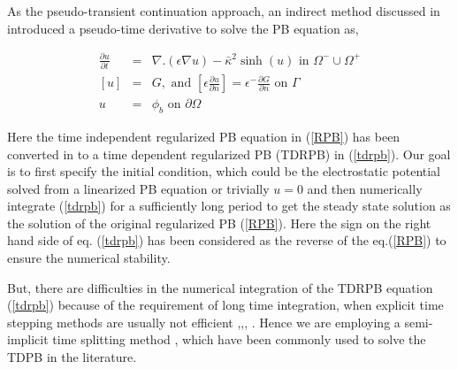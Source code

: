 As the pseudo-transient continuation approach, an indirect method discussed in \cite{zhao_pseudo-time-coupled_2011} \cite{Sayyed-Ahmad2004} \cite{shestakov_solution_2002} introduced a pseudo-time derivative to solve the PB equation as,  

\begin{eqnarray}
	 	\frac{\partial u}{\partial t} &=& \nabla.(\epsilon \nabla u)-\bar\kappa^2 \sinh(u) \text{ in } \Omega^- \cup \Omega^+ \label{tdrpb} \\
	 	  \left[u\right]&=& G,\text{ and } \left[\epsilon\frac{\partial u}{\partial n}\right]= \epsilon^-  \frac{\partial G}{\partial n} \text{ on } \Gamma\\ \label{jump}
	 	  u&=&\phi_b \text{ on } \partial \Omega
	\end{eqnarray}

Here the time independent regularized PB equation in (\ref{RPB}) has been converted in to a time dependent regularized PB (TDRPB) in (\ref{tdrpb}). Our goal is to first specify the initial condition, which could be the electrostatic potential solved from a linearized PB \cite{zhao_pseudo-time-coupled_2011} equation or trivially $u = 0$ and then numerically integrate (\ref{tdrpb}) for a sufficiently long period to get the steady state solution as the solution of the original regularized PB (\ref{RPB}). Here the sign on the right hand side of eq. (\ref{tdrpb}) has been considered as the reverse of the eq.(\ref{RPB}) to ensure the numerical stability. 

But, there are difficulties in the numerical integration of the TDRPB equation (\ref{tdrpb}) because of the requirement of long time integration, when explicit time stepping methods are usually not efficient \cite{Sayyed-Ahmad2004},\cite{shestakov_solution_2002},\cite{zhao_pseudo-time-coupled_2011}, \cite{zhao_operator_2014}. Hence we are employing a semi-implicit time splitting method \cite{Sayyed-Ahmad2004},\cite{shestakov_solution_2002} which have been commonly used to solve the TDPB in the literature. 
